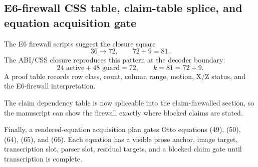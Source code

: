 \subsection{E6-firewall CSS table, claim-table splice, and equation acquisition gate}
\label{sec:bt1474-bt1476-e6-css-claim-acquisition}

The E6 firewall scripts suggest the closure square
\[
36\to72,
\qquad
72+9=81.
\]
The ABI/CSS closure reproduces this pattern at the decoder boundary:
\[
24\text{ active}+48\text{ guard}=72,
\qquad
k=81=72+9.
\]
A proof table records row class, count, column range, motion, X/Z status, and the
E6-firewall interpretation.

The claim dependency table is now spliceable into the claim-firewalled section,
so the manuscript can show the firewall exactly where blocked claims are stated.

Finally, a rendered-equation acquisition plan gates Otto equations (49), (50),
(64), (65), and (66).  Each equation has a visible prose anchor, image target,
transcription slot, parser slot, residual targets, and a blocked claim gate until
transcription is complete.
